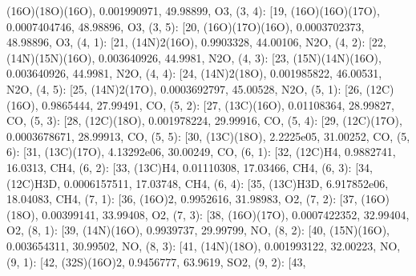 \documentclass[letterpaper,10pt,english]{sphinxmanual}
\begin{document}
\begin{fulllineitems}
\textquotesingle{}(16O)(18O)(16O)\textquotesingle{}, 0.001990971, 49.98899, \textquotesingle{}O3\textquotesingle{}{]}, (3, 4): {[}19, \textquotesingle{}(16O)(16O)(17O)\textquotesingle{}, 0.0007404746, 48.98896, \textquotesingle{}O3\textquotesingle{}{]}, (3, 5): {[}20, \textquotesingle{}(16O)(17O)(16O)\textquotesingle{}, 0.0003702373, 48.98896, \textquotesingle{}O3\textquotesingle{}{]}, (4, 1): {[}21, \textquotesingle{}(14N)2(16O)\textquotesingle{}, 0.9903328, 44.00106, \textquotesingle{}N2O\textquotesingle{}{]}, (4, 2): {[}22, \textquotesingle{}(14N)(15N)(16O)\textquotesingle{}, 0.003640926, 44.9981, \textquotesingle{}N2O\textquotesingle{}{]}, (4, 3): {[}23, \textquotesingle{}(15N)(14N)(16O)\textquotesingle{}, 0.003640926, 44.9981, \textquotesingle{}N2O\textquotesingle{}{]}, (4, 4): {[}24, \textquotesingle{}(14N)2(18O)\textquotesingle{}, 0.001985822, 46.00531, \textquotesingle{}N2O\textquotesingle{}{]}, (4, 5): {[}25, \textquotesingle{}(14N)2(17O)\textquotesingle{}, 0.0003692797, 45.00528, \textquotesingle{}N2O\textquotesingle{}{]}, (5, 1): {[}26, \textquotesingle{}(12C)(16O)\textquotesingle{}, 0.9865444, 27.99491, \textquotesingle{}CO\textquotesingle{}{]}, (5, 2): {[}27, \textquotesingle{}(13C)(16O)\textquotesingle{}, 0.01108364, 28.99827, \textquotesingle{}CO\textquotesingle{}{]}, (5, 3): {[}28, \textquotesingle{}(12C)(18O)\textquotesingle{}, 0.001978224, 29.99916, \textquotesingle{}CO\textquotesingle{}{]}, (5, 4): {[}29, \textquotesingle{}(12C)(17O)\textquotesingle{}, 0.0003678671, 28.99913, \textquotesingle{}CO\textquotesingle{}{]}, (5, 5): {[}30, \textquotesingle{}(13C)(18O)\textquotesingle{}, 2.2225e\sphinxhyphen{}05, 31.00252, \textquotesingle{}CO\textquotesingle{}{]}, (5, 6): {[}31, \textquotesingle{}(13C)(17O)\textquotesingle{}, 4.13292e\sphinxhyphen{}06, 30.00249, \textquotesingle{}CO\textquotesingle{}{]}, (6, 1): {[}32, \textquotesingle{}(12C)H4\textquotesingle{}, 0.9882741, 16.0313, \textquotesingle{}CH4\textquotesingle{}{]}, (6, 2): {[}33, \textquotesingle{}(13C)H4\textquotesingle{}, 0.01110308, 17.03466, \textquotesingle{}CH4\textquotesingle{}{]}, (6, 3): {[}34, \textquotesingle{}(12C)H3D\textquotesingle{}, 0.0006157511, 17.03748, \textquotesingle{}CH4\textquotesingle{}{]}, (6, 4): {[}35, \textquotesingle{}(13C)H3D\textquotesingle{}, 6.917852e\sphinxhyphen{}06, 18.04083, \textquotesingle{}CH4\textquotesingle{}{]}, (7, 1): {[}36, \textquotesingle{}(16O)2\textquotesingle{}, 0.9952616, 31.98983, \textquotesingle{}O2\textquotesingle{}{]}, (7, 2): {[}37, \textquotesingle{}(16O)(18O)\textquotesingle{}, 0.00399141, 33.99408, \textquotesingle{}O2\textquotesingle{}{]}, (7, 3): {[}38, \textquotesingle{}(16O)(17O)\textquotesingle{}, 0.0007422352, 32.99404, \textquotesingle{}O2\textquotesingle{}{]}, (8, 1): {[}39, \textquotesingle{}(14N)(16O)\textquotesingle{}, 0.9939737, 29.99799, \textquotesingle{}NO\textquotesingle{}{]}, (8, 2): {[}40, \textquotesingle{}(15N)(16O)\textquotesingle{}, 0.003654311, 30.99502, \textquotesingle{}NO\textquotesingle{}{]}, (8, 3): {[}41, \textquotesingle{}(14N)(18O)\textquotesingle{}, 0.001993122, 32.00223, \textquotesingle{}NO\textquotesingle{}{]}, (9, 1): {[}42, \textquotesingle{}(32S)(16O)2\textquotesingle{}, 0.9456777, 63.9619, \textquotesingle{}SO2\textquotesingle{}{]}, (9, 2): {[}43, 
\end{fulllineitems}
\end{document}
